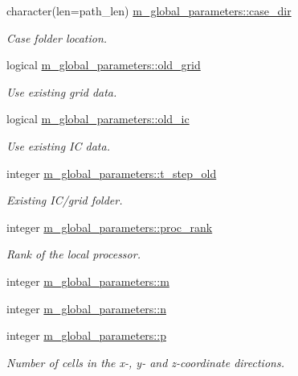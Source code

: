\begin{DoxyCompactItemize}
character(len=path\+\_\+len) \hyperlink{namespacem__global__parameters_a0b91e533fe3b3e112c42af4024014544}{m\+\_\+global\+\_\+parameters\+::case\+\_\+dir}
\begin{DoxyCompactList}\small\item\em Case folder location. \end{DoxyCompactList}\item 
logical \hyperlink{namespacem__global__parameters_a971692c50b4725d4724238b8a01a722e}{m\+\_\+global\+\_\+parameters\+::old\+\_\+grid}
\begin{DoxyCompactList}\small\item\em Use existing grid data. \end{DoxyCompactList}\item 
logical \hyperlink{namespacem__global__parameters_ae83688439601a9ff9bad58f09357a721}{m\+\_\+global\+\_\+parameters\+::old\+\_\+ic}
\begin{DoxyCompactList}\small\item\em Use existing IC data. \end{DoxyCompactList}\item 
integer \hyperlink{namespacem__global__parameters_a5d0554c4fef91acf46f683e8bcd29133}{m\+\_\+global\+\_\+parameters\+::t\+\_\+step\+\_\+old}
\begin{DoxyCompactList}\small\item\em Existing I\+C/grid folder. \end{DoxyCompactList}\item 
integer \hyperlink{namespacem__global__parameters_a383c6ff025d4ea09ddd4e2356042d86b}{m\+\_\+global\+\_\+parameters\+::proc\+\_\+rank}
\begin{DoxyCompactList}\small\item\em Rank of the local processor. \end{DoxyCompactList}\item 
integer \hyperlink{namespacem__global__parameters_aee38c9d03e9195858a93ec611b605f33}{m\+\_\+global\+\_\+parameters\+::m}
\item 
integer \hyperlink{namespacem__global__parameters_ac72422e5f77149bd32cf0cfd01a36544}{m\+\_\+global\+\_\+parameters\+::n}
\item 
integer \hyperlink{namespacem__global__parameters_ac040dbf547e6d5de8df08e864d8131e7}{m\+\_\+global\+\_\+parameters\+::p}
\begin{DoxyCompactList}\small\item\em Number of cells in the x-\/, y-\/ and z-\/coordinate directions. \end{DoxyCompactList}\item 

\end{DoxyCompactItemize}
